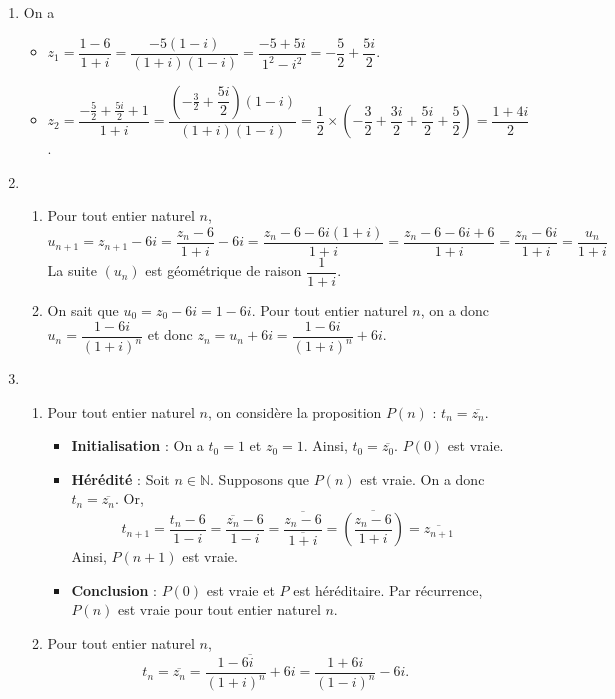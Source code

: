 \documentclass[11pt,fleqn, openany]{book} %
\begin{document}
\begin{solution}\hspace{0pt}

\begin{enumerate}\item 
On a \begin{itemize}\item \(z_1=\dfrac{1-6}{1+i}=\dfrac{-5(1-i)}{(1+i)(1-i)}=\dfrac{-5+5i}{1^2-i^2}=-\dfrac{5}{2}+\dfrac{5i}{2}\).
\item \(z_2 = \dfrac{-\frac{5}{2}+\frac{5i}{2}+1}{1+i}=\dfrac{\left(-\frac{3}{2}+\dfrac{5i}{2}\right)(1-i)}{(1+i)(1-i)}=\dfrac{1}{2} \times \left(-\dfrac{3}{2}+\dfrac{3i}{2}+\dfrac{5i}{2}+\dfrac{5}{2}\right)=\dfrac{1+4i}{2}\).\end{itemize}

\item 
\begin{enumerate} 
\item Pour tout entier naturel \(n\), 
\[ u_{n+1}=z_{n+1}-6i = \dfrac{z_n-6}{1+i} - 6i = \dfrac{z_n-6-6i(1+i)}{1+i}=\dfrac{z_n-6-6i+6}{1+i}=\dfrac{z_n-6i}{1+i}=\dfrac{u_n}{1+i}\]
La suite \((u_n)\) est géométrique de raison \(\dfrac{1}{1+i}\).

\item On sait que \(u_0 = z_0 -6i = 1-6i\). Pour tout entier naturel \(n\), on a donc \(u_n = \dfrac{1-6i}{(1+i)^n}\) et donc \(z_n=u_n+6i=\dfrac{1-6i}{(1+i)^n}+6i\).\end{enumerate}
\item \begin{enumerate}
\item Pour tout entier naturel \(n\), on considère la proposition \(P(n)\) : \(t_n = \overline{z_n}\).
\begin{itemize}\item \textbf{Initialisation} : On a \(t_0=1\) et \(z_0=1\). Ainsi, \(t_0 = \overline{z_0}\). \(P(0)\) est vraie.
\item \textbf{Hérédité} : Soit \(n\in \mathbb{N}\). Supposons que \(P(n)\) est vraie. On a donc \(t_n = \overline{z_n}\). Or,
\[t_{n+1}=\dfrac{t_n-6}{1-i}=\dfrac{\overline{z_n}-6}{1-i}=\dfrac{\overline{z_n-6}}{\overline{1+i}}=\overline{\left(\dfrac{z_n-6}{1+i}\right)}=\overline{z_{n+1}}\]
Ainsi, \(P(n+1)\) est vraie.
\item \textbf{Conclusion} : \(P(0)\) est vraie et \(P\) est héréditaire. Par récurrence, \(P(n)\) est vraie pour tout entier naturel \(n\).\end{itemize}
\item Pour tout entier naturel \(n\),
\[t_n = \overline{z_n}=\overline{\dfrac{1-6i}{(1+i)^n}+6i}=\dfrac{1+6i}{(1-i)^n}-6i.\]\end{enumerate}\end{enumerate}
\end{solution}
\end{document}
